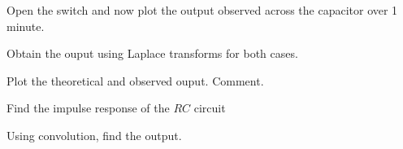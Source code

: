 %
\begin{problem}
Open the switch and now plot the output observed across the capacitor over 1 minute.  
\end{problem}
%
\begin{problem}
Obtain the ouput using Laplace transforms for both cases.
\end{problem}
%
\begin{problem}
	Plot the theoretical and observed ouput.  Comment.
\end{problem}
\begin{problem}
	Find the impulse response of the $RC$ circuit
\end{problem}
\begin{problem}
	Using convolution, find the output.
\end{problem}
